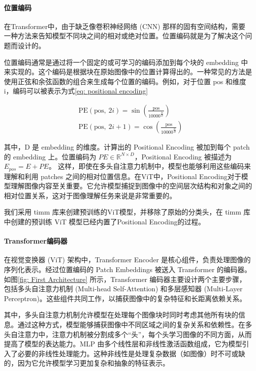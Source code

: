 \documentclass[a4paper]{ctexart}
\begin{document}
	\paragraph{位置编码}
	
	在Transformer中，由于缺乏像卷积神经网络 (CNN) 那样的固有空间结构，需要一种方法来告知模型不同块之间的相对或绝对位置。位置编码就是为了解决这个问题而设计的。
	
	位置编码通常是通过将一个固定的或可学习的编码添加到每个块的 embedding 中来实现的。这个编码是根据块在原始图像中的位置计算得出的。一种常见的方法是使用正弦和余弦函数的组合来生成每个位置的编码。例如，对于位置 pos 和维度 i，编码可以被表示为式\ref{eq: positional encoding}
	
	\begin{equation}
		\begin{aligned}
			&\text{PE}(\text{pos}, \ 2i) = \sin \left(\frac{\text{pos}}{10000^{\frac{2i}{D}}}\right) \\
			&\text{PE}(\text{pos}, \ 2i + 1) = \cos \left(\frac{\text{pos}}{10000^{\frac{2i}{D}}}\right)
		\end{aligned}
		\label{eq: positional encoding}
	\end{equation}
	
	其中，D 是 embedding 的维度。计算出的 Positional Encoding 被加到每个 patch 的 embedding 上。位置编码为 $PE \in \mathbb{R}^{N \times D}$，Positional Encoding 被描述为 $E_{pos} = E + PE$。 这样，即使在多头自注意力机制中，模型也能够利用这些编码来理解和利用 patches 之间的相对位置信息。在ViT中，Positional Encoding对于模型理解图像内容至关重要。它允许模型捕捉到图像中的空间层次结构和对象之间的相对位置关系，这对于图像理解任务来说是非常重要的。
	
	我们采用 timm 库来创建预训练的ViT模型，并移除了原始的分类头，在 timm 库中创建的预训练 ViT 模型已经内置了Positional Encoding的过程。
	
	\paragraph{Transformer编码器}
	
	在视觉变换器 (ViT) 架构中，Transformer Encoder 是核心组件，负责处理图像的序列化表示。经过位置编码的 Patch Embeddings 被送入 Transformer 的编码器。如图\ref{fig: First Architecture} 所示，Transformer 编码器主要设计两个主要步骤，包括多头自注意力机制 (Multi-head Self-Attention) 和多层感知器 (Multi-Layer Perceptron)。这些组件共同工作，以捕获图像中的复杂特征和长距离依赖关系。
	
	其中，多头自注意力机制允许模型在处理每个图像块时同时考虑其他所有块的信息。通过这种方式，模型能够捕获图像中不同区域之间的复杂关系和依赖性。在多头自注意力中，注意力机制被分割成多个“头”，每个头学习图像的不同方面，从而提高了模型的表达能力。MLP 由多个线性层和非线性激活函数组成，它为模型引入了必要的非线性处理能力。这种非线性是处理复杂数据（如图像）时不可或缺的，因为它允许模型学习更加复杂和抽象的特征表示。
	
\end{document}

